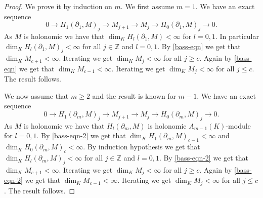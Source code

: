 \documentclass{amsart}
\newcommand{\ZZ}{\mathbb{Z} }
\newcommand{\rt}{\rightarrow}
\theoremstyle{plain}
\theoremstyle{definition}
\theoremstyle{remark}
\begin{document}
\begin{proof}
We prove it by induction on $m$.
We first assume $m = 1$. We have an exact sequence
\begin{equation}\label{bass-eqn}
0 \rt H_1(\partial_1, M)_j \rt M_{j+1} \rt M_j \rt H_0(\partial_1, M)_j \rt 0. 
\end{equation}
As $M$ is holonomic we have that $\dim_K H_l(\partial_1, M) < \infty $ for $l = 0,1$. In particular $\dim_K H_l(\partial_1, M)_j < \infty $ for all $j \in \ZZ$ and $l = 0,1$.
By \ref{bass-eqn} we get that $\dim_K M_{c+1} < \infty$. Iterating we get $\dim_K M_j < \infty$ for all $j \geq c$. Again by \ref{bass-eqn} we get that $\dim_K M_{c-1} < \infty$. Iterating we get $\dim_K M_j < \infty$ for all $j \leq c$. The result follows.

We now assume that $m \geq 2$ and the result is known for $m-1$. We have an exact sequence
\begin{equation}\label{bass-eqn-2}
0 \rt H_1(\partial_m, M)_j \rt M_{j+1} \rt M_j \rt H_0(\partial_m, M)_j \rt 0. 
\end{equation}
As $M$ is holonomic we have that $ H_l(\partial_m, M) $ is holonomic $A_{m-1}(K)$-module for $l = 0,1$. By \ref{bass-eqn-2} we get that $\dim_K H_1(\partial_m, M)_{c-1} < \infty $ and $\dim_K H_0(\partial_m, M)_{c} < \infty $. By induction hypothesis we get that  $ \dim_K H_l(\partial_m, M)_j < \infty $ for all $j \in \ZZ$ and $l = 0,1$. By \ref{bass-eqn-2} we get that $\dim_K M_{c+1} < \infty$. Iterating we get $\dim_K M_j < \infty$ for all $j \geq c$. Again by \ref{bass-eqn-2} we get that $\dim_K M_{c-1} < \infty$. Iterating we get $\dim_K M_j < \infty$ for all $j \leq c$. The result follows.
\end{proof}
\end{document}
